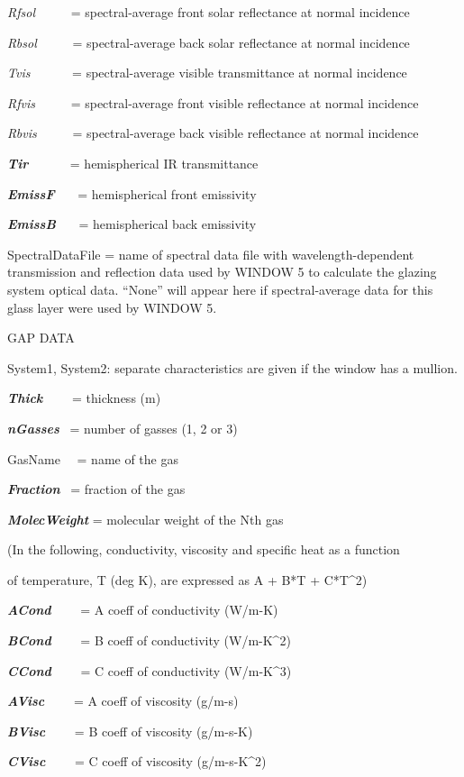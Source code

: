 \emph{Rfsol}~~~~~ = spectral-average front solar reflectance at normal incidence

\emph{Rbsol}~~~~~ = spectral-average back solar reflectance at normal incidence

\emph{Tvis}~~~~~~ = spectral-average visible transmittance at normal incidence

\emph{Rfvis}~~~~~ = spectral-average front visible reflectance at normal incidence

\emph{Rbvis}~~~~~ = spectral-average back visible reflectance at normal incidence

\textbf{\emph{Tir}}~~~~~~ = hemispherical IR transmittance

\textbf{\emph{EmissF}}~~~ = hemispherical front emissivity

\textbf{\emph{EmissB}}~~~ = hemispherical back emissivity

SpectralDataFile = name of spectral data file with wavelength-dependent transmission and reflection data used by WINDOW 5 to calculate the glazing system optical data. ``None'' will appear here if spectral-average data for this glass layer were used by WINDOW 5.

GAP DATA

System1, System2: separate characteristics are given if the window has a mullion.

\textbf{\emph{Thick}}~~~~ = thickness (m)

\textbf{\emph{nGasses}}~ = number of gasses (1, 2 or 3)

GasName~~ = name of the gas

\textbf{\emph{Fraction}}~ = fraction of the gas

\textbf{\emph{MolecWeight}} = molecular weight of the Nth gas

(In the following, conductivity, viscosity and specific heat as a function

of temperature, T (deg K), are expressed as A + B*T + C*T\^{}2)

\textbf{\emph{ACond}}~~~~ = A coeff of conductivity (W/m-K)

\textbf{\emph{BCond}}~~~~ = B coeff of conductivity (W/m-K\^{}2)

\textbf{\emph{CCond}}~~~~ = C coeff of conductivity (W/m-K\^{}3)

\textbf{\emph{AVisc}}~~~~ = A coeff of viscosity (g/m-s)

\textbf{\emph{BVisc}}~~~~ = B coeff of viscosity (g/m-s-K)

\textbf{\emph{CVisc}}~~~~ = C coeff of viscosity (g/m-s-K\^{}2)

